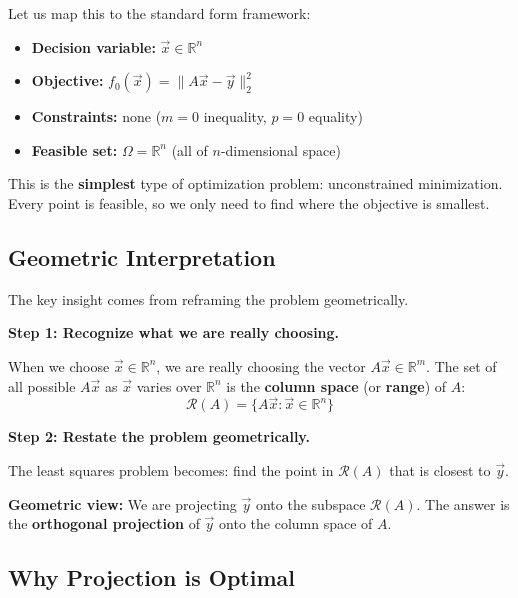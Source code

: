 \documentclass[10pt, twocolumn]{article}
\theoremstyle{definition}
\theoremstyle{plain}
\newcommand{\RR}{\mathbb{R}}
\newcommand{\Range}{\mathcal{R}}
\begin{document}
Let us map this to the standard form framework:

\begin{itemize}
    \item \textbf{Decision variable:} $\vec{x} \in \RR^n$
    \item \textbf{Objective:} $f_0(\vec{x}) = \|A\vec{x} - \vec{y}\|_2^2$
    \item \textbf{Constraints:} none ($m = 0$ inequality, $p = 0$ equality)
    \item \textbf{Feasible set:} $\Omega = \RR^n$ (all of $n$-dimensional space)
\end{itemize}

This is the \textbf{simplest} type of optimization problem: unconstrained minimization. Every point is feasible, so we only need to find where the objective is smallest.

\subsection{Geometric Interpretation}

The key insight comes from reframing the problem geometrically.

\textbf{Step 1: Recognize what we are really choosing.}

When we choose $\vec{x} \in \RR^n$, we are really choosing the vector $A\vec{x} \in \RR^m$. The set of all possible $A\vec{x}$ as $\vec{x}$ varies over $\RR^n$ is the \textbf{column space} (or \textbf{range}) of $A$:
\[
    \Range(A) = \{A\vec{x} : \vec{x} \in \RR^n\}
\]

\textbf{Step 2: Restate the problem geometrically.}

The least squares problem becomes: find the point in $\Range(A)$ that is closest to $\vec{y}$.

\begin{tcolorbox}[colframe=black!50]
\textbf{Geometric view:} We are projecting $\vec{y}$ onto the subspace $\Range(A)$. The answer is the \textbf{orthogonal projection} of $\vec{y}$ onto the column space of $A$.
\end{tcolorbox}

\subsection{Why Projection is Optimal}
\end{document}
